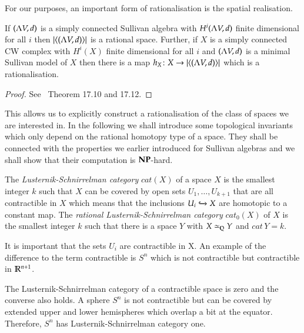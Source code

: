 For our purposes, an important form of rationalisation is the spatial realisation.

\begin{Theorem}
 If $(\Lambda V,d)$ is a simply connected Sullivan algebra with $H^i (\Lambda V,d)$ finite dimensional for all $i$ then
 $| \langle (\Lambda V,d) \rangle |$ is a rational space. Further, if $X$ is a simply connected CW complex with 
 $H^i(X)$ finite dimensional for all $i$ and $(\Lambda V,d)$ is a minimal Sullivan model of $X$ then there is 
 a map $h_X \colon X \to | \langle (\Lambda V,d) \rangle |$ which is a rationalisation.
\end{Theorem}

\begin{proof}
 See~\cite{Felix2001} Theorem 17.10 and 17.12.
\end{proof}


This allows us to explicitly construct a rationalisation of the class of spaces we are interested in.
In the following we shall introduce some topological invariants which only depend on the rational homotopy type of a
space. They shall be connected with the properties we earlier introduced for Sullivan algebras and we shall
show that their computation is $\mathbf{NP}$-hard.
\begin{Definition}
 The \emph{Lusternik-Schnirrelman category} $cat(X)$ of a space $X$ is the smallest integer $k$ such that 
 $X$ can be covered by open sets $U_1, \ldots, U_{k+1}$ that are all contractible in $X$ which
 means that the inclusions $U_i \xhookrightarrow{} X$ are homotopic to a constant map.
 The \emph{rational Lusternik-Schnirrelman category} $cat_0(X)$ of $X$ is the smallest integer $k$ such that there is a space $Y$
 with $ X \simeq_{\mathbb{Q}} Y$ and $cat \, Y = k$.
\end{Definition}

\begin{Remark}
 It is important that the sets $U_i$ are contractible in X. 
 An example of the difference to the term contractible is $S^n$ which is not contractible but contractible in $\mathbb{R}^{n+1}$. 
\end{Remark}

\begin{Example}
 The Lusternik-Schnirrelman category of a contractible space is zero and the converse also holds.
 A sphere $S^n$ is not contractible but can be covered by extended upper and lower hemispheres which
 overlap a  bit at the equator. Therefore, $S^n$ has Lusternik-Schnirrelman category one.
\end{Example}

